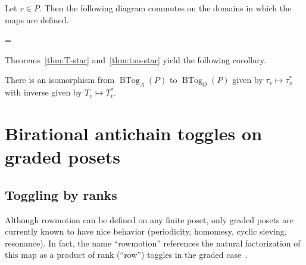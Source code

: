 \documentclass[ALCO,ThmDefs,Unicode,epreuves]{cedram}
\newcommand{\kk}{\mathbb{K}}
\newcommand{\up}{\Delta}
\DeclareMathOperator{\btog}{BTog}
\newenvironment{absolutelynopagebreak}
 {\par\nobreak\vfil\penalty0\vfilneg
 \vtop\bgroup}
 {\par\xdef\tpd{\the\prevdepth}\egroup
 \prevdepth=\tpd}
\begin{document}
\begin{absolutelynopagebreak}
\begin{theo}\label{thm:tau-star}
Let $v\in P$. Then the following diagram commutes on the domains in which the maps are defined.
\begin{center}
\end{center}
\end{theo}
\end{absolutelynopagebreak}

Theorems~\ref{thm:T-star} and~\ref{thm:tau-star}
yield the following corollary.

\begin{coro}
There is an isomorphism from $\btog_A(P)$ to
$\btog_O(P)$ given by $\tau_v \mapsto \tau_v^*$
with inverse given by $T_v \mapsto T_v^*$.
\end{coro}

\section{Birational antichain toggles on graded posets}\label{sec:graded}

\subsection{Toggling by ranks}

Although rowmotion can be defined on any finite poset,
only graded posets are currently known to have nice behavior (periodicity, homomesy, cyclic sieving, resonance).
In fact, the name ``rowmotion'' references the natural factorization of this map as a
product of rank (``row'') toggles in the graded case~\cite{strikerwilliams}.
\end{document}
